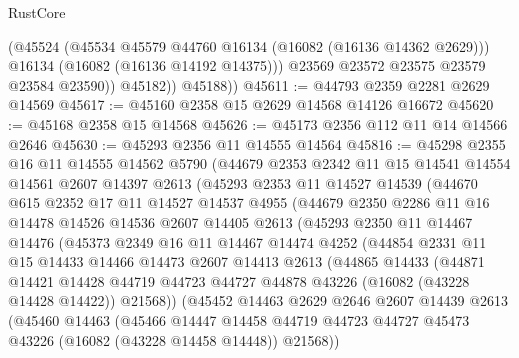 \begin{lexlean}{RustCore}
\begin{coremodule}
                (@45524
                  (@45534 @45579 @44760 @16134 (@16082 (@16136 @14362 @2629)))
                  @16134
                  (@16082 (@16136 @14192 @14375)))
                @23569
                @23572
                @23575
                @23579
                @23584
                @23590))
            @45182))
        @45188))
@45611 := @44793 @2359 @2281 @2629 @14569
@45617 := @45160 @2358 @15 @2629 @14568 @14126 @16672
@45620 := @45168 @2358 @15 @14568
@45626 := @45173 @2356 @112 @11 @14 @14566 @2646
@45630 := @45293 @2356 @11 @14555 @14564
@45816 := @45298
    @2355
    @16
    @11
    @14555
    @14562
    @5790
    (@44679
      @2353
      @2342
      @11
      @15
      @14541
      @14554
      @14561
      @2607
      @14397
      @2613
      (@45293
        @2353
        @11
        @14527
        @14539
        (@44670
          @615
          @2352
          @17
          @11
          @14527
          @14537
          @4955
          (@44679
            @2350
            @2286
            @11
            @16
            @14478
            @14526
            @14536
            @2607
            @14405
            @2613
            (@45293
              @2350
              @11
              @14467
              @14476
              (@45373
                @2349
                @16
                @11
                @14467
                @14474
                @4252
                (@44854
                  @2331
                  @11
                  @15
                  @14433
                  @14466
                  @14473
                  @2607
                  @14413
                  @2613
                  (@44865
                    @14433
                    (@44871
                      @14421
                      @14428
                      @44719
                      @44723
                      @44727
                      @44878
                      @43226
                      (@16082 (@43228 @14428 @14422))
                      @21568))
                  (@45452
                    @14463
                    @2629
                    @2646
                    @2607
                    @14439
                    @2613
                    (@45460
                      @14463
                      (@45466
                        @14447
                        @14458
                        @44719
                        @44723
                        @44727
                        @45473
                        @43226
                        (@16082 (@43228 @14458 @14448))
                        @21568))

\end{coremodule}
\end{lexlean}
